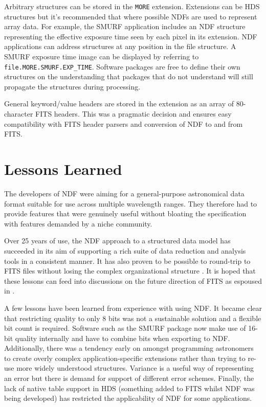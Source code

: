 \documentclass[11pt,twoside]{article}
\begin{document}
Arbitrary structures can be stored in the \texttt{MORE}
extension. Extensions can be HDS structures but it's recommended that
where possible NDFs are used to represent array data. For example, the
SMURF application includes an NDF structure representing the effective
exposure time seen by each pixel in its extension. NDF applications
can address structures at any position in the file structure. A SMURF
exposure time image can be displayed by referring to
\texttt{file.MORE.SMURF.EXP\_TIME}. Software packages are free to
define their own structures on the understanding that packages that do
not understand will still propagate the structures during processing.

General keyword/value headers are stored in the extension as an array of
80-character FITS headers. This was a pragmatic decision and ensures
easy compatibility with FITS header parsers and conversion of NDF to
and from FITS.

\section{Lessons Learned}

The developers of NDF were aiming for a general-purpose astronomical
data format suitable for use across multiple wavelength ranges. They
therefore had to provide features that were genuinely useful without
bloating the specification with features demanded by a niche
community.

Over 25 years of use, the NDF approach to a structured data model has
succeeded in its aim of supporting a rich suite of data reduction and
analysis tools in a consistent manner. It has also proven to be
possible to round-trip to FITS files without losing the complex
organizational structure \citep[see e.g.][]{1997STARB..19...14C}. It
is hoped that these lessons can feed into discussions on the future
direction of FITS as espoused in \citet{P90_adassxxiii}.

A few lessons have been learned from experience with using NDF. It
became clear that restricting quality to only 8 bits was not a
sustainable solution and a flexible bit count is required. Software
such as the SMURF package \citep{2013MNRAS.430.2545C} now make use of
16-bit quality internally and have to combine bits when exporting to
NDF. Additionally, there was a tendency early on amongst programming
astronomers to create overly
complex application-specific extensions rather than trying to re-use
more widely understood structures. Variance is a useful way of
representing an error but there is demand for support of different
error schemes. Finally, the lack of native table support in HDS
(something added to FITS \citep{1988A&AS...73..365H} whilst NDF was
being developed) has restricted the applicability of NDF for some
applications.


\end{document}
